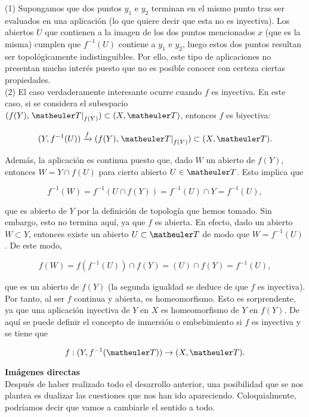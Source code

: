 \begin{obs}[Inyectividad]

(1) Supongamos que dos puntos $y_1$ e $y_2$ terminan en el mismo punto tras ser evaluados en una aplicación (lo que quiere decir que esta no es inyectiva). Los abiertos $U$ que contienen a la imagen de los dos puntos mencionados $x$ (que es la misma) cumplen que $f^{-1}(U)$ contiene a $y_1$ e $y_2$, luego estos dos puntos resultan ser topológicamente indistinguibles. Por ello, este tipo de aplicaciones no presentan mucho interés puesto que no es posible conocer con certeza ciertas propiedades. \\

(2) El caso verdaderamente interesante ocurre cuando $f$ es inyectiva. En este caso, si se considera el subespacio $(f(Y),\left.\T\right|_{f(Y)}) \subset (X,\T)$, entonces $f$ es biyectiva:

\[(Y,f^{-1}(U)) \xrightarrow{f} (f(Y),\left.\T\right|_{f(Y)}) \subset (X,\T).\]

Además, la aplicación es continua puesto que, dado $W$ un abierto de $f(Y)$, entonces $W=Y\cap f(U)$ para cierto abierto $U\in \T$. Esto implica que

\[f^{-1}(W)=f^{-1}(U\cap f(Y))=f^{-1}(U)\cap Y=f^{-1}(U),\]

que es abierto de $Y$ por la definición de topología que hemos tomado. Sin embargo, esto no termina aquí, ya que $f$ es abierta. En efecto, dado un abierto $W\subset Y$, entonces existe un abierto $U\subset \T$ de modo que $W=f^{-1}(U)$. De este modo, 

\[f(W)=f(f^{-1}(U))\cap f(Y)=(U)\cap f(Y)=f^{-1}(U),\]

que es un abierto de $f(Y)$ (la segunda igualdad se deduce de que $f$ es inyectiva). Por tanto, al ser $f$ continua y abierta, es homeomorfismo. Esto es sorprendente, ya que una aplicación inyectiva de $Y$ en $X$ es homeomorfismo de $Y$ en $f(Y)$. De aquí se puede definir el concepto de inmersión o embebimiento si $f$ es inyectiva y se tiene que 

\[f:(Y,f^{-1}(\T)) \to (X,\T).\]

\end{obs}

\textbf{Imágenes directas} \\

Después de haber realizado todo el desarrollo anterior, una posibilidad que se nos plantea es dualizar las cuestiones que nos han ido apareciendo. Coloquialmente, podríamos decir que vamos a cambiarle el sentido a todo. \\

